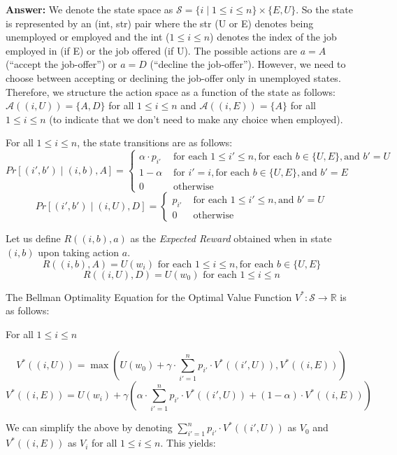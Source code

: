\documentclass[12pt]{exam}
\begin{document}
\begin{questions}
\begin{itemize}
{\bf Answer: } We denote the state space as $\mathcal{S} = \{i \mid 1 \leq i \leq n\} \times \{E, U\}$. So the state is represented by an (int, str) pair where the str (U or E) denotes being unemployed or employed and the int ($1\leq i \leq n$) denotes the index of the job employed in (if E) or the job offered (if U). The possible actions are $a=A$ (``accept the job-offer'') or $a=D$ (``decline the job-offer''). However, we need to choose between accepting or declining the job-offer only in unemployed states. Therefore, we structure the action space as a function of the state as follows: $\mathcal{A}((i, U)) = \{A,D\}$ for all $1\leq i \leq n$ and $\mathcal{A}((i, E)) = \{A\}$ for all $1 \leq i \leq n$ (to indicate that we don't need to make any choice when employed).

For all $1\leq i \leq n$, the state transitions are as follows:
$$
Pr[(i',b') \mid (i,b), A] =
\begin{cases}
\alpha \cdot p_{i'} & \text{ for each } 1 \leq i' \leq n, \text{for each } b \in \{U,E\}, \text{and } b' = U\\
1 - \alpha & \text{ for } i' = i, \text{for each } b \in \{U, E\}, \text{and } b' = E\\
0 & \text{ otherwise}
\end{cases}
$$
$$
Pr[(i',b') \mid (i,U), D] =
\begin{cases}
p_{i'} & \text{ for each } 1 \leq i' \leq n, \text{and } b' = U\\
0 & \text{ otherwise}
\end{cases}
$$

Let us define $R((i,b), a)$ as the {\em Expected Reward} obtained when in state $(i,b)$ upon taking action $a$.
$$R((i,b),A) = U(w_i) \text{ for each } 1\leq i\leq n, \text{for each } b \in \{U,E\}$$
$$R((i,U),D) = U(w_0) \text{ for each } 1\leq i\leq n$$

The Bellman Optimality Equation for the Optimal Value Function $V^* : \mathcal{S} \rightarrow \mathbb{R}$ is as follows:

For all $1\leq i \leq n$

$$V^*((i,U)) = \max(U(w_0) + \gamma \cdot \sum_{i'=1}^n p_{i'} \cdot V^*((i', U)), V^*((i,E))) $$
$$V^*((i,E)) = U(w_i) + \gamma (\alpha \cdot \sum_{i'=1}^n p_{i'} \cdot V^*((i', U)) + (1 - \alpha) \cdot V^*((i,E)) ) $$

We can simplify the above by denoting $\sum_{i'=1}^n p_{i'} \cdot V^*((i', U))$ as $V_0$ and $V^*((i,E))$ as $V_i$ for all $1\leq i \leq n$. This yields:


\end{itemize}
\end{questions}
\end{document}

